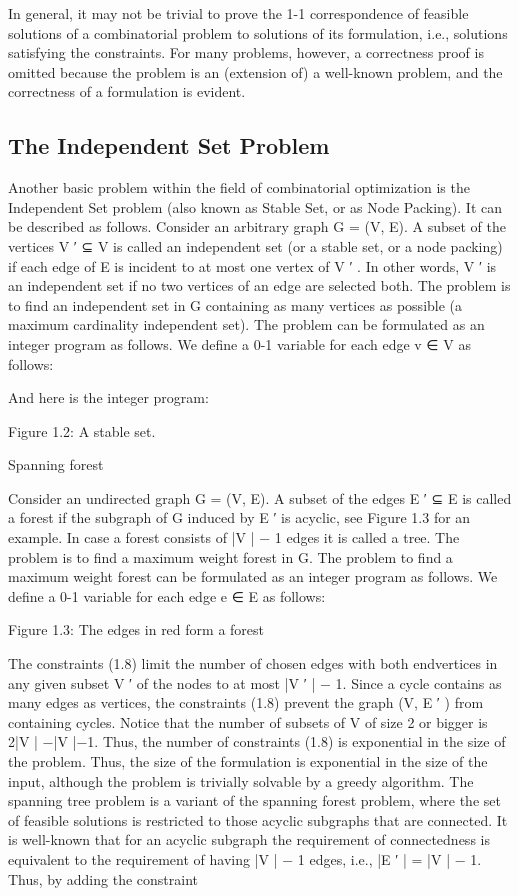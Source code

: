 \documentclass[titlepage]{book}
\begin{document}
In general, it may not be trivial to prove the 1-1 correspondence of feasible solutions of a combinatorial
problem to solutions of its formulation, i.e., solutions satisfying the constraints. For many problems,
however, a correctness proof is omitted because the problem is an (extension of) a well-known problem,
and the correctness of a formulation is evident.

\subsection{The Independent Set Problem}

Another basic problem within the field of combinatorial optimization is the Independent Set problem
(also known as Stable Set, or as Node Packing). It can be described as follows.
Consider an arbitrary graph G = (V, E). A subset of the vertices V ′ ⊆ V is called an independent set
(or a stable set, or a node packing) if each edge of E is incident to at most one vertex of V ′ . In other
words, V ′ is an independent set if no two vertices of an edge are selected both. The problem is to find an
independent set in G containing as many vertices as possible (a maximum cardinality independent set).
The problem can be formulated as an integer program as follows. We define a 0-1 variable for each edge
v ∈ V as follows:

And here is the integer program:


Figure 1.2: A stable set.


Spanning forest

Consider an undirected graph G = (V, E). A subset of the edges E ′ ⊆ E is called a forest if the subgraph
of G induced by E ′ is acyclic, see Figure 1.3 for an example. In case a forest consists of |V | − 1 edges it
is called a tree. The problem is to find a maximum weight forest in G.
The problem to find a maximum weight forest can be formulated as an integer program as follows. We
define a 0-1 variable for each edge e ∈ E as follows:


Figure 1.3: The edges in red form a forest


The constraints (1.8) limit the number of chosen edges with both endvertices in any given subset V ′ of
the nodes to at most |V ′ | − 1. Since a cycle contains as many edges as vertices, the constraints (1.8)
prevent the graph (V, E ′ ) from containing cycles.
Notice that the number of subsets of V of size 2 or bigger is 2|V | −|V |−1. Thus, the number of constraints
(1.8) is exponential in the size of the problem. Thus, the size of the formulation is exponential in the size
of the input, although the problem is trivially solvable by a greedy algorithm.
The spanning tree problem is a variant of the spanning forest problem, where the set of feasible solutions is
restricted to those acyclic subgraphs that are connected. It is well-known that for an acyclic subgraph the
requirement of connectedness is equivalent to the requirement of having |V | − 1 edges, i.e., |E ′ | = |V | − 1.
Thus, by adding the constraint
\end{document}
